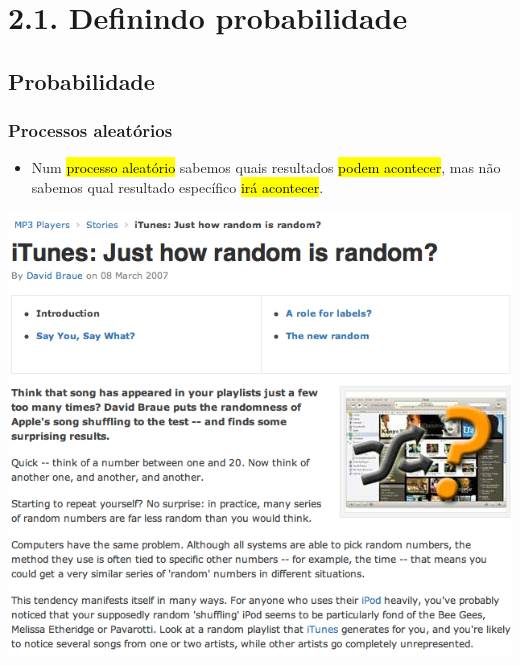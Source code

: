
\section{2.1. Definindo probabilidade}


\subsection{Probabilidade}


\begin{frame}
\frametitle{Processos aleatórios}

{
\begin{itemize}
\justifying
\item Num \hl{processo aleatório} sabemos quais resultados \hl{podem acontecer}, mas não sabemos qual resultado específico \hl{irá acontecer}.

\end{itemize}
}{
\begin{center}
\includegraphics[width=\textwidth]{2-1_define_probability/iTunes.png}
\end{center}
\justifying
{}
}

\end{frame}

